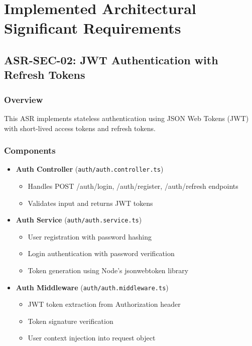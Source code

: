 \documentclass[12pt,oneside,a4paper]{article}
\begin{document}
\newpage

\section{Implemented Architectural Significant Requirements}

\subsection{ASR-SEC-02: JWT Authentication with Refresh Tokens}

\subsubsection{Overview}
This ASR implements stateless authentication using JSON Web Tokens (JWT) with short-lived access tokens and refresh tokens.

\subsubsection{Components}
\begin{itemize}
    \item \textbf{Auth Controller} (\texttt{auth/auth.controller.ts})
        \begin{itemize}
            \item Handles POST /auth/login, /auth/register, /auth/refresh endpoints
            \item Validates input and returns JWT tokens
        \end{itemize}
    \item \textbf{Auth Service} (\texttt{auth/auth.service.ts})
        \begin{itemize}
            \item User registration with password hashing
            \item Login authentication with password verification
            \item Token generation using Node's jsonwebtoken library
        \end{itemize}
    \item \textbf{Auth Middleware} (\texttt{auth/auth.middleware.ts})
        \begin{itemize}
            \item JWT token extraction from Authorization header
            \item Token signature verification
            \item User context injection into request object
        \end{itemize}
\end{itemize}
\end{document}
